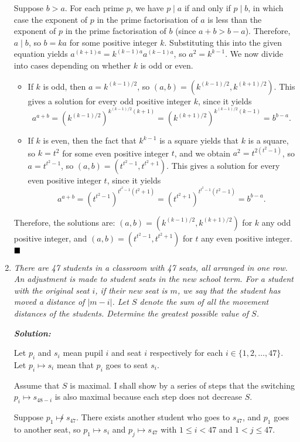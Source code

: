 \documentclass[12pt]{article}
\newcommand{\sol}{\textbf{\textit{Solution: }}}
\begin{document}
\begin{enumerate}[topsep=2\bigskipamount,itemsep=\bigskipamount]
Suppose $b > a$.
For each prime $p$, we have $p \mid a$ if and only if $p \mid b$, in which case the exponent of $p$ in the prime factorisation of $a$ is less than the exponent of $p$ in the prime factorisation of $b$ (since $a+b > b-a$).
Therefore, $a \mid b$, so $b = ka$ for some positive integer $k$.
Substituting this into the given equation yields $a^{(k + 1)a} = k^{(k - 1)a}a^{(k - 1)a}$, so $a^{2} = k^{k-1}$.
We now divide into cases depending on whether $k$ is odd or even.
\begin{itemize}
\item If $k$ is odd, then $a = k^{(k-1)/2}$, so $(a, b) = (k^{(k - 1)/2}, k^{(k + 1)/2})$.
This gives a solution for every odd positive integer $k$, since it yields
$$a^{a + b} = (k^{(k - 1)/2})^{k^{(k - 1)/2}(k + 1)} = (k^{(k + 1)/2})^{k^{(k - 1)/2}(k - 1)} = b^{b - a}.$$
\item If $k$ is even, then the fact that $k^{k-1}$ is a square yields that $k$ is a square, so $k = t^{2}$ for some even positive integer $t$, and we obtain $a^{2} = t^{2(t^{2} - 1)}$, so $a = t^{t^{2} - 1}$, so $(a, b) = (t^{t^{2} - 1}, t^{t^{2} + 1})$.
This gives a solution for every even positive integer $t$, since it yields
$$a^{a + b} = (t^{t^{2} - 1})^{t^{t^{2} - 1}(t^{2} + 1)} = (t^{t^{2} + 1})^{t^{t^{2} - 1}(t^{2} - 1)} = b^{b - a}.$$
\end{itemize}
Therefore, the solutions are: $(a, b) = (k^{(k - 1)/2}, k^{(k + 1)/2})$ for $k$ any odd positive integer, and $(a, b) = (t^{t^{2} - 1}, t^{t^{2} + 1})$ for $t$ any even positive integer. $\hfill\blacksquare$

\item \textit{There are 47 students in a classroom with 47 seats, all arranged in one row. An adjustment is made to student seats in the new school term. For a student with the original seat $i$, if their new seat is $m$, we say that the student has moved a distance of $|m-i|$.
Let $S$ denote the sum of all the movement distances of the students. Determine the greatest possible value of $S$.}

\sol

Let $p_i$ and $s_i$ mean pupil $i$ and seat $i$ respectively for each $i\in\{1,2,\dots,47\}$.
Let $p_i\mapsto s_i$ mean that $p_i$ goes to seat $s_i$.

Assume that $S$ is maximal.
I shall show by a series of steps that the switching $p_i\mapsto s_{48-i}$ is also maximal because each step does not decrease $S$.

Suppose $p_1 \not\mapsto s_{47}$.
There exists another student who goes to $s_{47}$, and $p_1$ goes to another seat, so $p_1 \mapsto s_{i}$ and $p_{j} \mapsto s_{47}$ with $1 \leqslant i < 47$ and $1 < j \leqslant 47$.


\end{enumerate}
\end{document}
